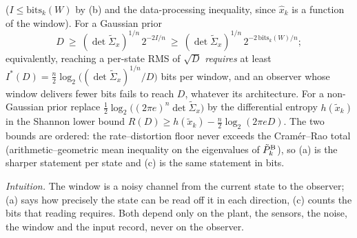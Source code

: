 \begin{theorem}
\begin{enumerate}
($I\le\mathrm{bits}_k(W)$ by (b) and the data-processing inequality, since $\hat x_k$ is a function of the window).
For a Gaussian prior
\[
D\ \ge\ (\det\tilde\Sigma_x)^{1/n}\,2^{-2I/n}\ \ge\ (\det\tilde\Sigma_x)^{1/n}\,2^{-2\,\mathrm{bits}_k(W)/n};
\]
equivalently, reaching a per-state RMS of $\sqrt D$ \emph{requires} at least
$I^*(D)=\tfrac n2\log_2\big((\det\tilde\Sigma_x)^{1/n}/D\big)$ bits per window, and an observer whose window
delivers fewer bits fails to reach $D$, whatever its architecture. For a non-Gaussian prior replace
$\tfrac12\log_2\big((2\pi e)^n\det\tilde\Sigma_x\big)$ by the differential entropy $h(\tilde x_k)$ in the Shannon
lower bound $R(D)\ge h(\tilde x_k)-\tfrac n2\log_2(2\pi eD)$. The two bounds are ordered: the rate--distortion
floor never exceeds the Cram\'er--Rao total (arithmetic--geometric mean inequality on the eigenvalues of
$\tilde P^{\rm B}_k$), so (a) is the sharper statement per state and (c) is the same statement in bits.
\end{enumerate}
\end{theorem}
\emph{Intuition.} The window is a noisy channel from the current state to the observer; (a) says how precisely
the state can be read off it in each direction, (c) counts the bits that reading requires. Both depend only on
the plant, the sensors, the noise, the window and the input record, never on the observer.
